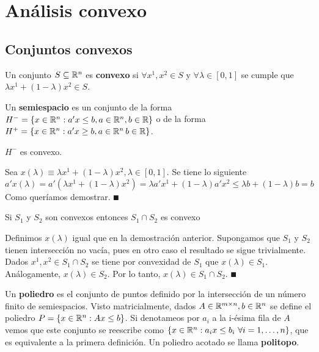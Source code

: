 \documentclass[PM.tex]{subfiles}
\begin{document}
\chapter{Análisis convexo}
\section{Conjuntos convexos}

\begin{defi}
Un conjunto $S\subseteq\mathbb{R}^n$ es \textbf{convexo} si $\forall x^1,x^2\in S$ y $\forall  \lambda\in[0,1]$ se cumple que $\lambda x^1 + (1-\lambda)x^2\in S$.
\end{defi}

\begin{defi}
Un \textbf{semiespacio} es un conjunto de la forma $H^-=\left\{x\in\mathbb{R}^n: a'x\leq b, a\in\mathbb{R}^n, b\in\mathbb{R}\right\}$ o de la forma $H^+=\left\{x\in\mathbb{R}^n: a'x\geq b, a\in\mathbb{R}^n\,b\in\mathbb{R}\right\}$.
\end{defi}

\begin{prop}
$H^-$ es convexo.
\end{prop}

\begin{dem}
Sea $x(\lambda)\equiv \lambda x^1 + (1-\lambda)x^2, \lambda\in[0,1]$. Se tiene lo siguiente
\[
a'x(\lambda)=a'(\lambda x^1 + (1-\lambda)x^2)=\lambda a'x^1 +(1-\lambda)a'x^2\leq \lambda b+(1-\lambda)b=b
\]
Como queríamos demostrar. $\QED$
\end{dem}

\begin{prop}
Si $S_1$ y $S_2$ son convexos entonces $S_1\cap S_2$ es convexo
\end{prop}
\begin{dem}
Definimos $x(\lambda)$ igual que en la demostración anterior. Supongamos que $S_1$ y $S_2$ tienen intersección no vacía, pues en otro caso el resultado se sigue trivialmente. Dados $x^1,x^2\in S_1 \cap S_2$ se tiene por convexidad de $S_1$ que $x(\lambda)\in S_1$. Análogamente, $x(\lambda)\in S_2$. Por lo tanto, $x(\lambda)\in S_1\cap S_2$. $\QED$
\end{dem}

\begin{defi}
Un \textbf{poliedro} es el conjunto de puntos definido por la intersección de un número finito de semiespacios. Visto matricialmente, dados $A\in\mathbb{R}^{m\times n}, b\in \mathbb{R}^n$ se define el poliedro $P=\left\{x\in \mathbb{R}^n: Ax\leq b\right\}$. Si denotameos por $a_i$ a la i-ésima fila de $A$ vemos que este conjunto se reescribe como $\left\{x\in\mathbb{R}^n: a_ix\leq b_i\ \forall i=1,\dots, n\right\}$, que es equivalente a la primera definición. Un poliedro acotado se llama \textbf{politopo}. 
\end{defi}
\end{document}
